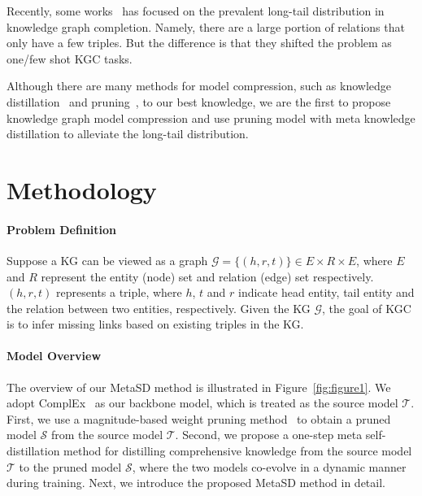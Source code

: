 \documentclass[11pt]{article}
\begin{document}
Recently, some works~\citep{xiong2018one,sheng2020adaptive} has focused on the prevalent long-tail distribution in knowledge graph completion. Namely, there are a large portion of relations that only have a few triples. But the difference is that they shifted the problem as one/few shot KGC tasks. 

Although there are many methods for model compression, such as knowledge distillation~\citep{hinton2015distilling} and pruning~\citep{han2015deep}, to our best knowledge, we are the first to propose knowledge graph model compression and use pruning model with meta knowledge distillation to alleviate the long-tail distribution. 
\fi

\section{Methodology}
\paragraph{Problem Definition}
Suppose a KG can be viewed as a graph $\mathcal{G}=\{(h, r, t)\}\in E\times R\times E$, where $E$ and $R$ represent the entity (node) set and relation (edge) set respectively. $(h, r, t)$ represents a triple, where $h$, $t$ and $r$ indicate head entity, tail entity and the relation between two entities, respectively. Given the KG $\mathcal{G}$, the goal of KGC is to infer missing links
based on existing triples in the KG.

\paragraph{Model Overview}
The overview of our MetaSD method is illustrated in Figure~\ref{fig:figure1}. 
We adopt ComplEx~\citep{trouillon2016complex} as our backbone model, which is treated as the source model $\mathcal{T}$. First, we use a magnitude-based weight pruning method~\citep{han2015deep,zhu2017prune} to obtain a pruned model $\mathcal{S}$ from the source model $\mathcal{T}$. Second, we propose a one-step meta self-distillation method for distilling comprehensive knowledge from the source model $\mathcal{T}$ to the pruned model $\mathcal{S}$, where the two models co-evolve in a dynamic manner during training. Next, we introduce the proposed MetaSD method in detail. 
\end{document}
